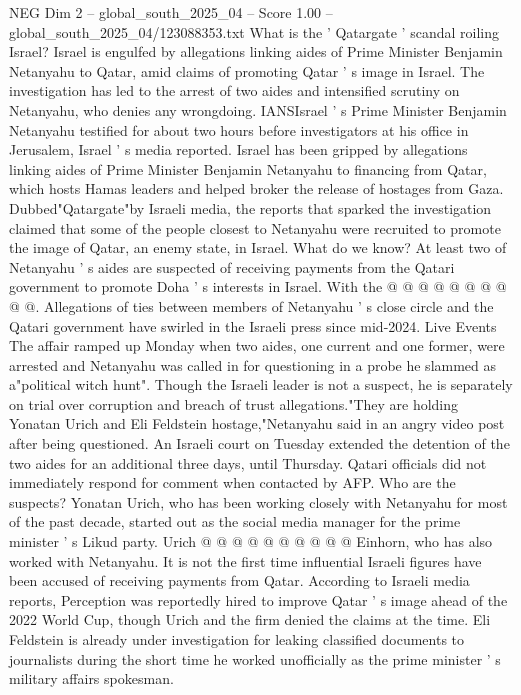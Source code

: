 \begin{textsample}{NEG Dim 2 – global\_south\_2025\_04 – Score 1.00 – global\_south\_2025\_04/123088353.txt}  \label{ex:f2_neg_171}
What is the ' Qatargate ' scandal roiling Israel?
Israel is engulfed by allegations linking aides of Prime Minister Benjamin Netanyahu to Qatar, amid claims of promoting Qatar ' s image in Israel.
The investigation has led to the arrest of two aides and intensified scrutiny on Netanyahu, who denies any wrongdoing.
IANSIsrael ' s Prime Minister Benjamin Netanyahu testified for about two hours before investigators at his office in Jerusalem, Israel ' s media reported.
Israel has been gripped by allegations linking aides of Prime Minister Benjamin Netanyahu to financing from Qatar, which hosts Hamas leaders and helped broker the release of hostages from Gaza.
Dubbed"Qatargate"by Israeli media, the reports that sparked the investigation claimed that some of the people closest to Netanyahu were recruited to promote the image of Qatar, an enemy state, in Israel.
What do we know?
At least two of Netanyahu ' s aides are suspected of receiving payments from the Qatari government to promote Doha ' s interests in Israel.
With the @ @ @ @ @ @ @ @ @ @.
Allegations of ties between members of Netanyahu ' s close circle and the Qatari government have swirled in the Israeli press since mid-2024.
Live Events The affair ramped up Monday when two aides, one current and one former, were arrested and Netanyahu was called in for questioning in a probe he slammed as a"political witch hunt".
Though the Israeli leader is not a suspect, he is separately on trial over corruption and breach of trust allegations."They are holding Yonatan Urich and Eli Feldstein hostage,"Netanyahu said in an angry video post after being questioned.
An Israeli court on Tuesday extended the detention of the two aides for an additional three days, until Thursday.
Qatari officials did not immediately respond for comment when contacted by AFP.
Who are the suspects?
Yonatan Urich, who has been working closely with Netanyahu for most of the past decade, started out as the social media manager for the prime minister ' s Likud party.
Urich @ @ @ @ @ @ @ @ @ @ Einhorn, who has also worked with Netanyahu.
It is not the first time influential Israeli figures have been accused of receiving payments from Qatar.
According to Israeli media reports, Perception was reportedly hired to improve Qatar ' s image ahead of the 2022 World Cup, though Urich and the firm denied the claims at the time.
Eli Feldstein is already under investigation for leaking classified documents to journalists during the short time he worked unofficially as the prime minister ' s military affairs spokesman.

\end{textsample}
